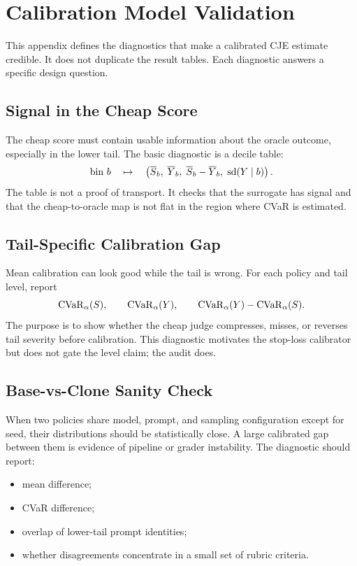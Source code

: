 \section{Calibration Model Validation}
\label{app:calibration-validation}
\label{app:forensics}

This appendix defines the diagnostics that make a calibrated CJE estimate
credible. It does not duplicate the result tables. Each diagnostic answers a
specific design question.

\subsection{Signal in the Cheap Score}
\label{app:reliability}

The cheap score must contain usable information about the oracle outcome,
especially in the lower tail. The basic diagnostic is a decile table:
\[
\text{bin }b
\quad\mapsto\quad
\left(
\overline{S}_b,\;
\overline{Y}_b,\;
\overline{S}_b-\overline{Y}_b,\;
\mathrm{sd}(Y\mid b)
\right).
\]
The table is not a proof of transport. It checks that the surrogate has signal
and that the cheap-to-oracle map is not flat in the region where CVaR is
estimated.

\subsection{Tail-Specific Calibration Gap}

Mean calibration can look good while the tail is wrong. For each policy and
tail level, report
\[
\mathrm{CVaR}_\alpha(S),\qquad
\mathrm{CVaR}_\alpha(Y),\qquad
\mathrm{CVaR}_\alpha(Y)-\mathrm{CVaR}_\alpha(S).
\]
The purpose is to show whether the cheap judge compresses, misses, or reverses
tail severity before calibration. This diagnostic motivates the stop-loss
calibrator but does not gate the level claim; the audit does.

\subsection{Base-vs-Clone Sanity Check}
\label{app:bcforensics}

When two policies share model, prompt, and sampling configuration except for
seed, their distributions should be statistically close. A large calibrated
gap between them is evidence of pipeline or grader instability. The diagnostic
should report:
\begin{itemize}[leftmargin=*,nosep]
\item mean difference;
\item CVaR difference;
\item overlap of lower-tail prompt identities;
\item whether disagreements concentrate in a small set of rubric criteria.
\end{itemize}

